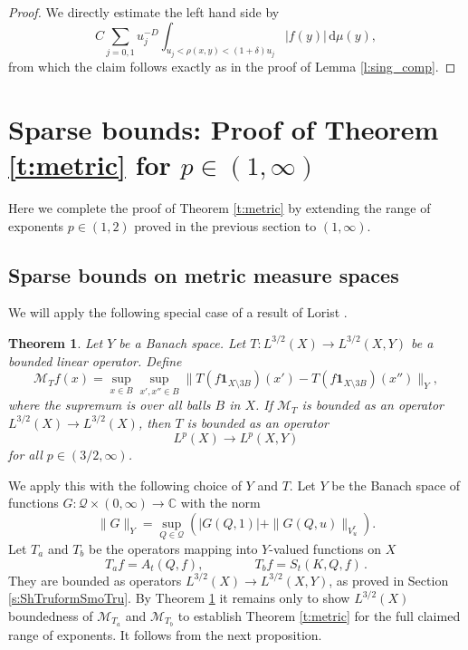 \documentclass[12pt,reqno,a4paper,dvipsnames]{amsart}
\theoremstyle{plain}
\newtheorem{theorem}{Theorem}
\theoremstyle{definition}
\numberwithin{theorem}{section}
\numberwithin{equation}{section}
\newcommand{\AD}{D}
\begin{document}
\begin{proof}
    We directly estimate the left hand side by
    \[
        C \sum_{j=0,1} u_j^{-\AD} \int_{u_j < \rho(x,y) < (1 + \delta)u_j} |f(y)| \, \mathrm{d}\mu(y),
    \]
    from which the claim follows exactly as in the proof of Lemma \ref{l:sing_comp}.
\end{proof}


\section{Sparse bounds: Proof of Theorem \ref{t:metric} for \texorpdfstring{$p \in (1,\infty)$}{p in (1,infty)}}
\label{s:sparse}

Here we complete the proof of Theorem \ref{t:metric} by extending the range of exponents $p \in (1,2)$ proved in the previous section to $(1, \infty)$. 

\subsection{Sparse bounds on metric measure spaces}

We will apply the following special case of a result of Lorist \cite[Corollary 1.2]{Lorist2021}. 

\begin{theorem}\label{t:lorist}
    Let $Y$ be a Banach space. Let $T: L^{3/2}(X) \to L^{3/2}(X, Y)$ be a bounded linear operator. Define 
    \begin{equation}\label{e:sparse_nont}
        \mathcal{M}_T f(x) = \sup_{x\in B} \sup_{x',x'' \in B} \|T(f \mathbf{1}_{X \setminus 3B})(x') - T(f \mathbf{1}_{X \setminus 3B})(x'')\|_Y,
    \end{equation}
    where the supremum is over all balls $B$ in $X$. If $\mathcal{M}_T$ is bounded as an operator $L^{3/2}(X)\to L^{3/2}(X)$, then $T$ is bounded as an operator 
    \[
        L^p(X) \to L^p(X, Y)
    \]
    for all $p \in (3/2, \infty)$.
\end{theorem}

We apply this with the following choice of $Y$ and $T$. Let $Y$ be the Banach space of functions $G: \mathcal{Q} \times (0, \infty) \to \mathbb{C}$ with the norm  
\[
    \| G \|_Y = \sup_{Q \in \mathcal{Q}} (|G(Q,1)| + \|G(Q, u)\|_{V^r_u}).
\]
Let $T_a$ and $T_b$ be the operators mapping into $Y$-valued functions on $X$
\[
    T_af = A_t(Q, f), \qquad\qquad
    T_bf = S_t(K, Q, f)\,.
\]
They are bounded as operators $L^{3/2}(X) \to L^{3/2}(X, Y)$, as proved in Section \ref{s:ShTruformSmoTru}. By Theorem \ref{t:lorist} it remains only to show $L^{3/2}(X)$ boundedness of $\mathcal{M}_{T_a}$ and $\mathcal{M}_{T_b}$ to establish Theorem \ref{t:metric} for the full claimed range of exponents. It follows from the next proposition. 
\end{document}
